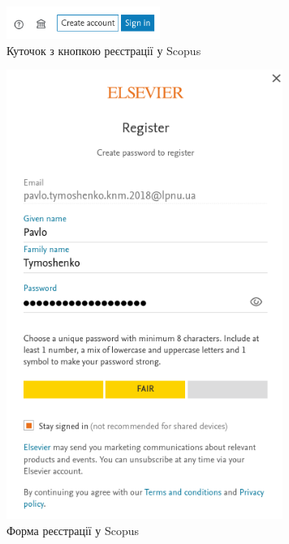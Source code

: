 \documentclass[oneside,14pt,a4paper]{extreport}
\begin{document}
\begin{figure}[H]
    \centering
    \includegraphics[width=5cm]{imgs/scopus_auth_corner.png}
    \caption{Куточок з кнопкою реєстрації у Scopus}
    \label{pic:scopus-corner}
\end{figure}

\begin{figure}[H]
    \centering
    \includegraphics[width=9cm]{imgs/scopus_register_form.png}
    \caption{Форма реєстрації у Scopus}
    \label{pic:scopus-form}
\end{figure}
\end{document}
